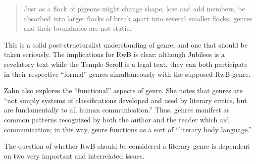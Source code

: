 \begin{quote}
Just as a flock of pigeons might change shape, lose and add members, be
absorbed into larger flocks of break apart into several smaller flocks,
genres and their boundaries are not static.\autocite[277]{zahn_jbl2012}
\end{quote}

This is a solid post-structuralist understanding of genre, and one that
should be taken seriously. The implications for RwB is clear: although
Jubilees is a revelatory text while the Temple Scroll is a legal text,
they can both participate in their respective ``formal'' genres
simultaneously with the supposed RwB genre.

Zahn also explores the ``functional'' aspects of genre. She notes that
genres are ``not simply systems of classifications developed and used by
literary critics, but are fundamentally to all human
communication.''\autocite[280]{zahn_jbl2012} Thus, genres manifest as
common patterns recognized by both the author and the reader which aid
communication;\autocites[276]{zahn_jbl2012}[See
also][199]{newsome_grossman2010} in this way, genre functions as a sort
of ``literary body language.''

The question of whether RwB should be considered a literary genre is
dependent on two very important and interrelated issues.
